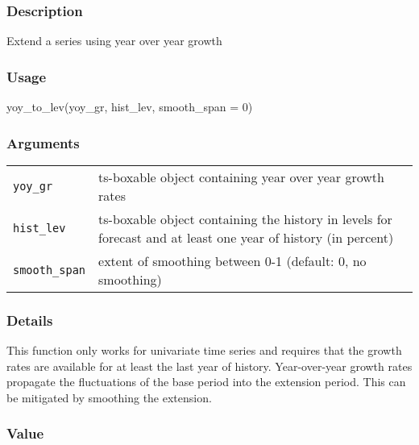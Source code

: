 \documentclass[
  letterpaper,
  DIV=11,
  numbers=noendperiod]{scrreport}
\newenvironment{Shaded}{\begin{snugshade}}{\end{snugshade}}
\newcommand{\AttributeTok}[1]{\textcolor[rgb]{0.40,0.45,0.13}{#1}}
\newcommand{\DecValTok}[1]{\textcolor[rgb]{0.68,0.00,0.00}{#1}}
\newcommand{\FunctionTok}[1]{\textcolor[rgb]{0.28,0.35,0.67}{#1}}
\newcommand{\NormalTok}[1]{\textcolor[rgb]{0.00,0.23,0.31}{#1}}
\begin{document}
\subsubsection{Description}\label{description-38}

Extend a series using year over year growth

\subsubsection{Usage}\label{usage-38}

\begin{Shaded}
\begin{Highlighting}[]
\FunctionTok{yoy\_to\_lev}\NormalTok{(yoy\_gr, hist\_lev, }\AttributeTok{smooth\_span =} \DecValTok{0}\NormalTok{)}
\end{Highlighting}
\end{Shaded}

\subsubsection{Arguments}\label{arguments-38}

\begin{longtable}[]{@{}ll@{}}
\toprule\noalign{}
\endhead
\bottomrule\noalign{}
\endlastfoot
\texttt{yoy\_gr} & ts-boxable object containing year over year growth
rates \\
\texttt{hist\_lev} & ts-boxable object containing the history in levels
for forecast and at least one year of history (in percent) \\
\texttt{smooth\_span} & extent of smoothing between 0-1 (default: 0, no
smoothing) \\
\end{longtable}

\subsubsection{Details}\label{details-13}

This function only works for univariate time series and requires that
the growth rates are available for at least the last year of history.
Year-over-year growth rates propagate the fluctuations of the base
period into the extension period. This can be mitigated by smoothing the
extension.

\subsubsection{Value}\label{value-38}
\end{document}
